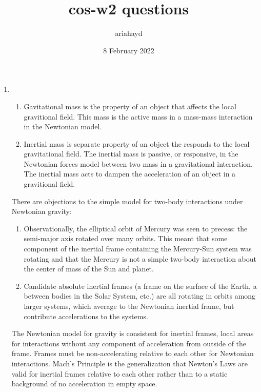 \documentclass{paper}
\title{cos-w2 questions}
\author{ariahayd}
\date{8 February 2022}
\begin{document}
 

\maketitle

\begin{enumerate}
    \item %
      \begin{enumerate}
        \item
          Gavitational mass is the property of an object that affects the
          local gravitional field. This mass is the active mass in a mass-mass
          interaction in the Newtonian model.
        \item
          Inertial mass is separate property of an object the responds to
          the local gravitational field. The inertial mass is passive, or 
          responsive, in the Newtonian forces model between two mass in a 
          gravitational interaction. The inertial mass acts to dampen the
          acceleration of an object in a gravitional field.
      \end{enumerate}

      There are objections to the simple model for two-body interactions
      under Newtonian gravity:
      \begin{enumerate}
        \item
          Observationally, the elliptical orbit of Mercury was seen to
          precess: the semi-major axis rotated over many orbits. This meant
          that some component of the inertial frame containing the 
          Mercury-Sun system was rotating and that the Mercury is not a simple 
          two-body interaction about the center of mass of the Sun and planet.
        \item
          Candidate absolute inertial frames (a frame on the surface of the
          Earth, a between bodies in the Solar System, etc.) are all rotating
          in orbits among larger systems, which average to the Newtonian 
          inertial frame, but contribute accelerations to the systems. 
      \end{enumerate}
      
      The Newtonian model for gravity is consistent for inertial frames, local
      areas for interactions without any component of acceleration from 
      outside of the frame. Frames must be non-accelerating relative to 
      each other for Newtonian interactions. Mach's Principle is
      the generalization that Newton's Laws are valid for inertial frames 
      relative to each other rather than to a static background of no 
      acceleration in empty space.



\end{enumerate}
\end{document}
